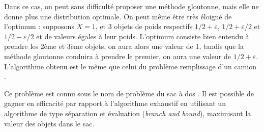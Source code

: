\Q
Dans ce cas, on peut sans difficulté proposer une méthode gloutonne, mais elle ne donne plus une distribution optimale. On peut même être très éloigné de l'optimum : supposons $X=1$, et 3 objets de poids respectifs $1/2+\varepsilon$, $1/2+\varepsilon/2$ et $1/2-\varepsilon/2$ et de valeurs égales à leur poids. L'optimum consiste bien entendu à prendre les 2ème et 3ème objets, on aura alors une valeur de 1, tandis que la méthode gloutonne conduira à prendre le premier, on aura une valeur de $1/2+\varepsilon$. L'algorithme obtenu est le même que celui du problème \og remplissage d'un camion \fg{}.
\medskip

Ce problème est connu sous le nom de \og problème du sac à dos \fg{}. Il est possible de gagner en efficacité par rapport à l'algorithme exhaustif en utilisant un algorithme de type séparation et évaluation (\textit{branch and bound}), maximisant la valeur des objets dans le sac.
\bigskip

\Fin
